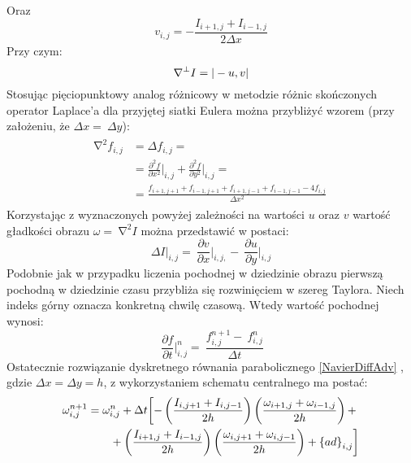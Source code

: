 \documentclass[12pt, twoside, openany]{report}
\theoremstyle{definition}
\begin{document}
Oraz
\begin{equation}
 v_{i,j}=-\frac{I_{i+1,j}+I_{i-1,j}}{2\Delta x}
\label{v}
\end{equation}
Przy czym:
\begin{equation}\\
{\mathrm{\nabla }}^{\bot }I=|-u,v|
\label{gradI}
\end{equation}
Stosując pięciopunktowy analog różnicowy w metodzie różnic skończonych operator Laplace’a dla przyjętej siatki Eulera można przybliżyć wzorem (przy założeniu, że $\Delta x=\ \Delta y$):
\begin{align}
\begin{aligned}
{\mathrm{\nabla }}^2f_{i,j} &= \Delta f_{i,j}=\\[1ex]
&={\frac{{\partial }^2f}{\partial x^2}}\bigg|_{i,j}+{\frac{{\partial }^2f}{\partial y^2}}\bigg|_{i,j}=\\
&=\frac{f_{i+1,j+1}+f_{i-1,j+1}+f_{i+1,j-1}+f_{i-1,j-1}-4f_{i,j}}{\Delta x^2}\ 
\end{aligned}
\label{LaplaceOpr}
\end{align}
Korzystając z wyznaczonych powyżej zależności na wartości $u$ oraz $v$ wartość gładkości obrazu $\omega =\ {\mathrm{\nabla }}^2I$ można przedstawić w postaci: 
\begin{equation}
\Delta {I}\big|_{i,j}=\ {\frac{\partial v}{\partial x}}\bigg|_{i,j,}-\ {\frac{\partial u}{\partial y}}\bigg|_{i,j}
\label{discreteVorticity}
\end{equation}
Podobnie jak w przypadku liczenia pochodnej w dziedzinie obrazu pierwszą pochodną w dziedzinie czasu przybliża się rozwinięciem w szereg Taylora. Niech indeks górny oznacza konkretną chwilę czasową. Wtedy wartość pochodnej wynosi:
\begin{equation}
\ {{\frac{\partial f}{\partial t}}\bigg|^n_{i,j}=\ \frac{f^{n+1}_{i,j}-\ f^n_{i,j}}{\Delta t}}
\label{dfdt}
\end{equation}
Ostatecznie rozwiązanie dyskretnego równania parabolicznego \eqref{NavierDiffAdv} , gdzie $\Delta x= \Delta y=h$, z wykorzystaniem schematu centralnego ma postać:
\begin{align}
{\omega }^{n+1}_{i,j} &= {\omega }^n_{i,j}+\Delta t\biggl[
-\left(\frac{I_{i,j+1}+I_{i,j-1}}{2h}\right)\left(\frac{{\omega }_{i+1,j}
+{\omega }_{i-1,j}}{2h}\right)+\notag\\ 
&\qquad+ \left(\frac{I_{i+1,j}+I_{i-1,j}}{2h}\right)\left(\frac{{\omega }_{i,j+1}+{\omega }_{i,j-1}}{2h}\right)+{\left\{ad\right\}}_{i,j} \biggr]
\label{NavierDiffAdvCen}
\end{align}
\end{document}
